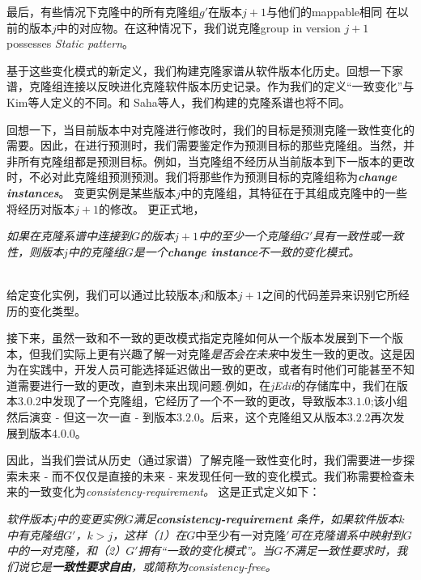 最后，有些情况下克隆中的所有克隆组$ g'$在版本$ j + 1 $与他们的mappable相同
在以前的版本$ j $中的对应物。在这种情况下，我们说克隆group in version $ j + 1 $ possesses {\em  Static pattern}。

基于这些变化模式的新定义，我们构建克隆家谱从软件版本化历史。回想一下家谱，克隆组连接以反映进化克隆软件版本历史记录。作为我们的定义“一致变化”与Kim等人定义的不同。和 Saha等人，我们构建的克隆系谱也将不同。


回想一下，当目前版本中对克隆进行修改时，我们的目标是预测克隆一致性变化的需要。因此，在进行预测时，我们需要鉴定作为预测目标的那些克隆组。当然，并非所有克隆​​组都是预测目标。例如，当克隆组不经历从当前版本到下一版本的更改时，不必对此克隆组预测预测。我们将那些作为预测目标的克隆组称为{\em {\bf change instances}}。
变更实例是某些版本$ j $中的克隆组，其特征在于其组成克隆中的一些将经历对版本$ j + 1 $的修改。
更正式地，\\

\begin {definition} 
\label {defn-3}
{\em 如果在克隆系谱中连接到$ G $的版本$ j + 1 $中的至少一个克隆组$ G'$具有一致性或一致性，则版本$ j $中的克隆组$ G $是一个{\bf  change instance}不一致的变化模式。
}
\end {definition}

~\\
给定变化实例，我们可以通过比较版本$ j $和版本$ j + 1 $之间的代码差异来识别它所经历的变化类型。

接下来，虽然一致和不一致的更改模式指定克隆如何从一个版本发展到下一个版本，但我们实际上更有兴趣了解一对克隆{\em 是否会在未来}中发生一致的更改。这是因为在实践中，开发人员可能选择延迟做出一致的更改，或者有时他们可能甚至不知道需要进行一致的更改，直到未来出现问题.例如，在{\em  jEdit}的存储库中，我们在版本$ 3.0.2 $中发现了一个克隆组，它经历了一个不一致的更改，导致版本$ 3.1.0 $;该小组然后演变 - 但这一次一直 - 到版本$ 3.2.0 $。后来，这个克隆组又从版本$ 3.2.2 $再次发展到版本$ 4.0.0 $。

因此，当我们尝试从历史（通过家谱）了解克隆一致性变化时，我们需要进一步探索未来 - 而不仅仅是直接的未来 - 来发现任何一致的变化模式。我们称需要检查未来的一致变化为{\em consistency-requirement。}
这是正式定义如下：\\

\begin {definition} 
\label {defn-4}
{\em 
软件版本$ j $中的变更实例$ G $满足{\bf consistency-requirement }条件，如果软件版本$ k $中有克隆组$ G'$，$ k> j $，这样（1）在$ G中至少有一对克隆'$可在克隆谱系中映射到$ G $中的一对克隆，和（2）$ G'$拥有“一致的变化模式”。当$ G $不满足一致性要求时，我们说它是{\bf 一致性要求自由}，或简称为{\em consistency-free}。 
  }
\end {definition}

